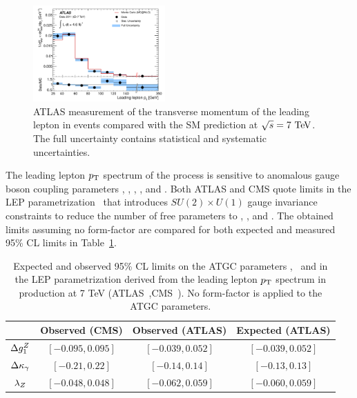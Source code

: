 % 
\begin{figure}[htbp]
  \begin{center}
  \includegraphics[width=0.45\textwidth]{figures/sss-inclboson-diboson-wwprod-pt-fiducial.pdf}
  \caption{ATLAS measurement of the transverse momentum of the leading lepton in \WW events compared with the SM prediction at $\rts = 7\TeV$. The full uncertainty contains statistical and systematic uncertainties.}
\label{fig:sss-WWprod-pt-fiducial}
\end{center}
\end{figure}


The leading lepton $p_{\mathrm{T}}$ spectrum of the \WW process is sensitive to anomalous gauge boson coupling parameters
\dkg,  \dkz, \lg, \lz, and \dgz. Both ATLAS and CMS quote limits in the LEP 
parametrization~\cite{Gounaris:1996rz} that introduces $SU(2) \times U(1)$ gauge invariance 
constraints to reduce the number of free parameters to \dgz,  \dkg, and \lz. The obtained limits assuming 
no form-factor are compared for both expected and measured 95\% CL limits in Table~\ref{tab:sss-WZprod-ATGC}.

\begin{table}\centering
\caption{Expected and observed 95\% CL limits on the ATGC parameters 
\dkg, \lz\ and \dgz\; in the LEP parametrization derived from the leading lepton $p_{\mathrm{T}}$ spectrum in \WW production at 7 TeV (ATLAS~\cite{ATLAS:2012mec},CMS~\cite{Chatrchyan:2013yaa}). No form-factor is applied to the ATGC parameters.}
\label{tab:sss-WZprod-ATGC}
\begin{tabular}{cccc}
\hline
& Observed (CMS) & Observed (ATLAS) & Expected (ATLAS)\\
\hline
$\Delta g_1^Z$ & $[-0.095, 0.095]$ & $[-0.039, 0.052]$ & $[-0.039, 0.052]$ \\
$\Delta \kappa_\gamma$ & $[-0.21, 0.22]$ & $[-0.14, 0.14 ]$ & $[-0.13, 0.13]$ \\
$\lambda_Z$ & $[-0.048, 0.048]$ & $[-0.062, 0.059]$ & $[-0.060, 0.059]$ \\
\hline
\end{tabular}
\end{table}





